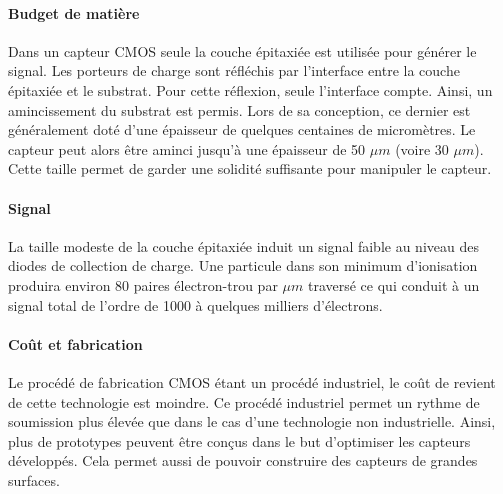   \paragraph{Budget de mati\`ere}
  
  Dans un capteur CMOS seule la couche \'epitaxi\'ee est utilis\'ee pour g\'en\'erer le signal. Les porteurs de charge sont r\'efl\'echis par l'interface entre la couche \'epitaxi\'ee et le substrat. Pour cette r\'eflexion, seule l'interface compte. Ainsi, un amincissement du substrat est permis. Lors de sa conception, ce dernier est g\'en\'eralement dot\'e d'une \'epaisseur de quelques centaines de microm\`etres. Le capteur peut alors \^etre aminci jusqu'à une \'epaisseur de 50 $\mu m$ (voire 30 $\mu m$). Cette taille permet de garder une solidit\'e suffisante pour manipuler le capteur.
  
  \paragraph{Signal}
  
  La taille modeste de la couche \'epitaxi\'ee induit un signal faible au niveau des diodes de collection de charge. Une particule dans son minimum d'ionisation produira environ 80 paires \'electron-trou par $\mu m$ travers\'e ce qui conduit \`a un signal total de l'ordre de 1000 \`a quelques milliers d'\'electrons.

  \paragraph{Coût et fabrication}
  
  Le proc\'ed\'e de fabrication CMOS \'etant un proc\'ed\'e industriel, le co\^ut de revient de cette technologie est moindre. Ce proc\'ed\'e industriel permet un rythme de soumission plus \'elev\'ee que dans le cas d'une technologie non industrielle. Ainsi, plus de prototypes peuvent être con\c{c}us dans le but d'optimiser les capteurs d\'evelopp\'es. Cela permet aussi de pouvoir construire des capteurs de grandes surfaces.
  
